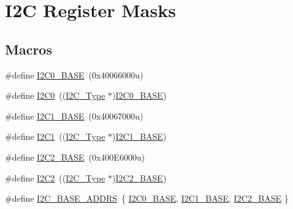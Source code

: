 \hypertarget{group___i2_c___register___masks}{}\section{I2C Register Masks}
\label{group___i2_c___register___masks}
\subsection*{Macros}
\begin{DoxyCompactItemize}
\item 
\#define \mbox{\hyperlink{group___i2_c___register___masks_gabf0928baf4e4350633ca9050b65d1939}{I2\+C0\+\_\+\+B\+A\+SE}}~(0x40066000u)
\item 
\#define \mbox{\hyperlink{group___i2_c___register___masks_ga86abb2e8858d177c04e60c41e9242045}{I2\+C0}}~((\mbox{\hyperlink{struct_i2_c___type}{I2\+C\+\_\+\+Type}} $\ast$)\mbox{\hyperlink{group___i2_c___register___masks_gabf0928baf4e4350633ca9050b65d1939}{I2\+C0\+\_\+\+B\+A\+SE}})
\item 
\#define \mbox{\hyperlink{group___i2_c___register___masks_gacd72dbffb1738ca87c838545c4eb85a3}{I2\+C1\+\_\+\+B\+A\+SE}}~(0x40067000u)
\item 
\#define \mbox{\hyperlink{group___i2_c___register___masks_gab45d257574da6fe1f091cc45b7eda6cc}{I2\+C1}}~((\mbox{\hyperlink{struct_i2_c___type}{I2\+C\+\_\+\+Type}} $\ast$)\mbox{\hyperlink{group___i2_c___register___masks_gacd72dbffb1738ca87c838545c4eb85a3}{I2\+C1\+\_\+\+B\+A\+SE}})
\item 
\#define \mbox{\hyperlink{group___i2_c___register___masks_ga04bda70f25c795fb79f163b633ad4a5d}{I2\+C2\+\_\+\+B\+A\+SE}}~(0x400\+E6000u)
\item 
\#define \mbox{\hyperlink{group___i2_c___register___masks_gafa60ac20c1921ef1002083bb3e1f5d16}{I2\+C2}}~((\mbox{\hyperlink{struct_i2_c___type}{I2\+C\+\_\+\+Type}} $\ast$)\mbox{\hyperlink{group___i2_c___register___masks_ga04bda70f25c795fb79f163b633ad4a5d}{I2\+C2\+\_\+\+B\+A\+SE}})
\item 
\#define \mbox{\hyperlink{group___i2_c___register___masks_gae92fd6c5f532d79f1a47e76c6dbc33f0}{I2\+C\+\_\+\+B\+A\+S\+E\+\_\+\+A\+D\+D\+RS}}~\{ \mbox{\hyperlink{group___i2_c___register___masks_gabf0928baf4e4350633ca9050b65d1939}{I2\+C0\+\_\+\+B\+A\+SE}}, \mbox{\hyperlink{group___i2_c___register___masks_gacd72dbffb1738ca87c838545c4eb85a3}{I2\+C1\+\_\+\+B\+A\+SE}}, \mbox{\hyperlink{group___i2_c___register___masks_ga04bda70f25c795fb79f163b633ad4a5d}{I2\+C2\+\_\+\+B\+A\+SE}} \}

\end{DoxyCompactItemize}
